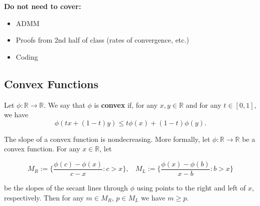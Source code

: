 \textbf{Do not need to cover:}

\begin{itemize}

\item ADMM

\item Proofs from 2nd half of class (rates of convergence, etc.)

\item Coding

\end{itemize}

\subsection{Convex Functions}\label{cvx.sec.jensen.etc}

\begin{definition}\label{cvx.defn.convex} Let $\phi:\mathbb{R}\to\mathbb{R}$.  We say that $\phi$ is \textbf{convex} if, for any $x,y\in\mathbb{R}$ and for any $t\in[0,1]$, we have
$$\phi(tx+(1-t)y)\leq t\phi(x)+(1-t)\phi(y).$$

\end{definition}

\begin{lemma}\label{cvx.slope.nondec} The slope of a convex function is nondecreasing. More formally, let \(\phi: \mathbb{R} \to \mathbb{R}\) be a convex function. For any \(x \in \mathbb{R}\), let 

\[
M_R:= \{ \frac{\phi(c) - \phi(x) }{c-x}  : c > x\}, \ \ \ \ M_L:= \{ \frac{\phi(x) - \phi(b) }{x - b}  : b > x\}
\]

be the slopes of the secant lines through \(\phi\) using points to the right and left of \(x\), respectively. Then for any \(m \in M_R\), \(p \in M_L\) we have \(m \geq p\).

\end{lemma}

